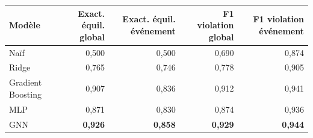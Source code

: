 \begin{tabular}{lrrrr}
\toprule
Modèle & Exact. équil. global & Exact. équil. événement & F1 violation global & F1 violation événement \\
\midrule
Naïf & 0{,}500 & 0{,}500 & 0{,}690 & 0{,}874 \\
Ridge & 0{,}765 & 0{,}746 & 0{,}778 & 0{,}905 \\
Gradient Boosting & 0{,}907 & 0{,}836 & 0{,}912 & 0{,}941 \\
MLP & 0{,}871 & 0{,}830 & 0{,}874 & 0{,}936 \\
GNN & \textbf{0{,}926} & \textbf{0{,}858} & \textbf{0{,}929} & \textbf{0{,}944} \\
\bottomrule
\end{tabular}